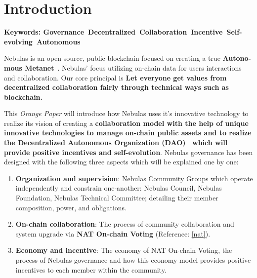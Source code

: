 
\section{Introduction}

\textbf{Keywords: Governance\ Decentralized\ Collaboration\ Incentive\ Self-evolving\ Autonomous }

\vspace{2em}

Nebulas is an open-source, public blockchain focused on creating a true
\textbf{Autono-mous Metanet}~\cite{AutonomousMetanet}. Nebulas' focus utilizing on-chain data for users interactions and collaboration. Our core principal is \textbf{Let everyone get values from decentralized collaboration fairly through technical ways such as blockchain.}~\cite{vision}

This \textit{Orange Paper} will introduce how Nebulas uses it's innovative technology to realize its vision of creating a \textbf{collaboration model with the help of unique innovative technologies to manage on-chain public assets and to realize the Decentralized Autonomous Organization (DAO)~\cite{DAO} which will provide positive incentives and self-evolution}. Nebulas governance has been designed with the following three aspects which will be explained one by one:

\begin{enumerate}
	\item \textbf{Organization and supervision}:
	Nebulas Community Groups which operate independently and constrain one-another: Nebulas Council, Nebulas Foundation, Nebulas Technical Committee; detailing their member composition, power, and obligations.
	\item \textbf{On-chain collaboration}:
	The process of community collaboration and system upgrade via \textbf{NAT On-chain Voting} (Reference: \ref{nat}).
	\item \textbf{Economy and incentive}:
	The economy of NAT On-chain Voting, the process of Nebulas governance and how this economy model provides positive incentives to each member within the community.
\end{enumerate}
